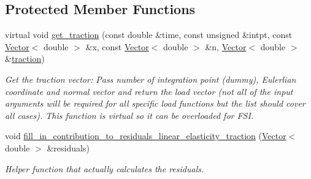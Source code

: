\subsection*{Protected Member Functions}
\begin{DoxyCompactItemize}
\item 
virtual void \hyperlink{classoomph_1_1LinearElasticityTractionElement_aa6cf9c9f8a36d2a32d56723b081f2079}{get\+\_\+traction} (const double \&time, const unsigned \&intpt, const \hyperlink{classoomph_1_1Vector}{Vector}$<$ double $>$ \&x, const \hyperlink{classoomph_1_1Vector}{Vector}$<$ double $>$ \&n, \hyperlink{classoomph_1_1Vector}{Vector}$<$ double $>$ \&\hyperlink{classoomph_1_1LinearElasticityTractionElement_aefc580c2f9219976426f5c0b5f70ca77}{traction})
\begin{DoxyCompactList}\small\item\em Get the traction vector\+: Pass number of integration point (dummy), Eulerlian coordinate and normal vector and return the load vector (not all of the input arguments will be required for all specific load functions but the list should cover all cases). This function is virtual so it can be overloaded for F\+SI. \end{DoxyCompactList}\item 
void \hyperlink{classoomph_1_1LinearElasticityTractionElement_a5a51ebdfb9ad2b79b7c4367a0577330e}{fill\+\_\+in\+\_\+contribution\+\_\+to\+\_\+residuals\+\_\+linear\+\_\+elasticity\+\_\+traction} (\hyperlink{classoomph_1_1Vector}{Vector}$<$ double $>$ \&residuals)
\begin{DoxyCompactList}\small\item\em Helper function that actually calculates the residuals. \end{DoxyCompactList}\end{DoxyCompactItemize}
